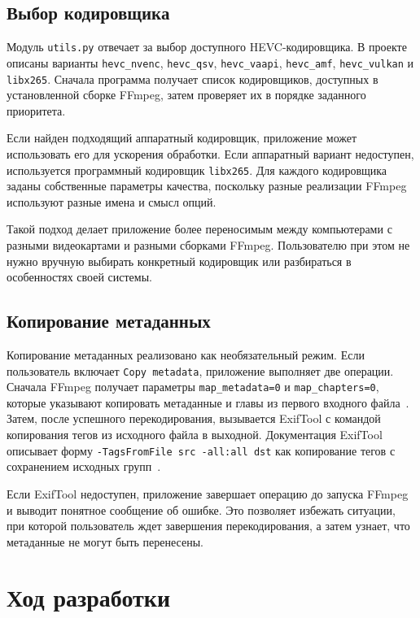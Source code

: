 \documentclass[14pt,a4paper]{extarticle}
\begin{document}
\subsection{Выбор кодировщика}

Модуль \texttt{utils.py} отвечает за выбор доступного HEVC-кодировщика. В проекте описаны варианты \texttt{hevc\_nvenc}, \texttt{hevc\_qsv}, \texttt{hevc\_vaapi}, \texttt{hevc\_amf}, \texttt{hevc\_vulkan} и \texttt{libx265}. Сначала программа получает список кодировщиков, доступных в установленной сборке FFmpeg, затем проверяет их в порядке заданного приоритета.

Если найден подходящий аппаратный кодировщик, приложение может использовать его для ускорения обработки. Если аппаратный вариант недоступен, используется программный кодировщик \texttt{libx265}. Для каждого кодировщика заданы собственные параметры качества, поскольку разные реализации FFmpeg используют разные имена и смысл опций.

Такой подход делает приложение более переносимым между компьютерами с разными видеокартами и разными сборками FFmpeg. Пользователю при этом не нужно вручную выбирать конкретный кодировщик или разбираться в особенностях своей системы.

\subsection{Копирование метаданных}

Копирование метаданных реализовано как необязательный режим. Если пользователь включает \texttt{Copy metadata}, приложение выполняет две операции. Сначала FFmpeg получает параметры \texttt{map\_metadata=0} и \texttt{map\_chapters=0}, которые указывают копировать метаданные и главы из первого входного файла~\cite{ffmpegmetadata}. Затем, после успешного перекодирования, вызывается ExifTool с командой копирования тегов из исходного файла в выходной. Документация ExifTool описывает форму \texttt{-TagsFromFile src -all:all dst} как копирование тегов с сохранением исходных групп~\cite{exiftool}.

Если ExifTool недоступен, приложение завершает операцию до запуска FFmpeg и выводит понятное сообщение об ошибке. Это позволяет избежать ситуации, при которой пользователь ждет завершения перекодирования, а затем узнает, что метаданные не могут быть перенесены.

\section{Ход разработки}
\end{document}
